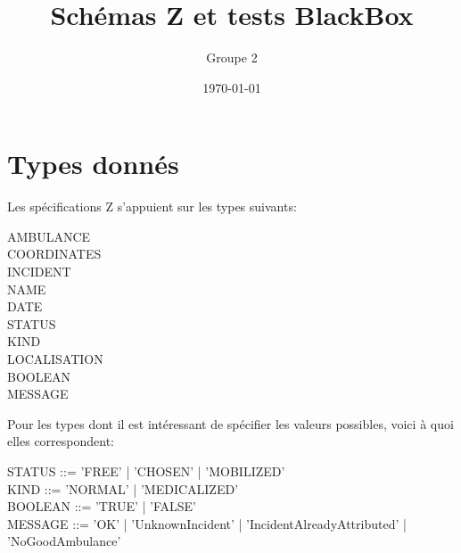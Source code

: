 \documentclass[12pt]{article}
\begin{document}
\title{Schémas Z et tests BlackBox}
\author{Groupe 2}
\date{\today}
\maketitle


\section{Types donnés}
Les spécifications Z s'appuient sur les types suivants:
\begin{zed}
AMBULANCE \\
COORDINATES \\
INCIDENT \\
NAME \\
DATE \\
STATUS  \\
KIND \\
LOCALISATION \\
BOOLEAN \\
MESSAGE  \\
\end{zed}

Pour les types dont il est intéressant de spécifier les valeurs possibles, voici à quoi elles correspondent:
\begin{syntax}
STATUS ::= 'FREE' | 'CHOSEN' | 'MOBILIZED' \\
KIND ::= 'NORMAL' | 'MEDICALIZED' \\
BOOLEAN ::= 'TRUE'  | 'FALSE' \\
MESSAGE ::= 'OK' | 'UnknownIncident' | 'IncidentAlreadyAttributed' | 'NoGoodAmbulance'
\end{syntax}
\end{document}
